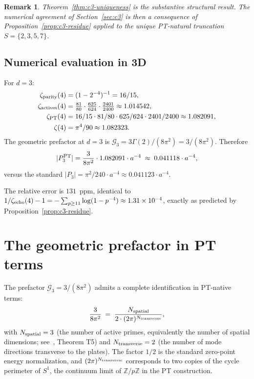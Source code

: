 \documentclass[11pt,a4paper]{article}
\newtheorem{remark}{Remark}
\newcommand{\PTset}{\{2,3,5,7\}}
\newcommand{\Nspatial}{N_{\rm spatial}}
\newcommand{\Ntrans}{N_{\rm transverse}}
\begin{document}
\begin{remark}
Theorem~\ref{thm:c3-uniqueness} is the substantive structural result. The numerical agreement
of Section~\ref{sec:c3} is then a consequence of Proposition~\ref{prop:c3-residue} applied to
the unique PT-natural truncation $S = \PTset$.
\end{remark}

\subsection{Numerical evaluation in 3D}

For $d = 3$:
\begin{align*}
\zeta_{\rm parity}(4) &= (1 - 2^{-4})^{-1} = 16/15,\\
\zeta_{\rm actives}(4) &= \tfrac{81}{80} \cdot \tfrac{625}{624} \cdot \tfrac{2401}{2400} \approx 1.014542,\\
\zeta_{\rm PT}(4) &= 16/15 \cdot 81/80 \cdot 625/624 \cdot 2401/2400 \approx 1.082091,\\
\zeta(4) &= \pi^{4}/90 \approx 1.082323.
\end{align*}
The geometric prefactor at $d = 3$ is
$\mathcal{G}_{3} = 3 \Gamma(2)/(8\pi^{2}) = 3/(8\pi^{2})$. Therefore
\[
|P_{3}^{\rm PT}| = \frac{3}{8\pi^{2}} \cdot 1.082091 \cdot a^{-4}
\;\approx\; 0.041118 \cdot a^{-4},
\]
versus the standard $|P_{3}| = \pi^{2}/240 \cdot a^{-4} \approx 0.041123 \cdot a^{-4}$.

The relative error is $131$~ppm, identical to $1/\zeta_{\rm echo}(4) - 1 = -\sum_{p \geq 11}\log(1-p^{-4}) \approx 1.31 \times 10^{-4}$, exactly as predicted by Proposition~\ref{prop:c3-residue}.

\section{The geometric prefactor in PT terms}
\label{sec:prefactor}

The prefactor $\mathcal{G}_{3} = 3/(8\pi^{2})$ admits a complete identification in PT-native terms:
\begin{equation}
\frac{3}{8\pi^{2}} \;=\; \frac{\Nspatial}{2 \cdot (2\pi)^{\Ntrans}},
\label{eq:prefactor-pt}
\end{equation}
with $\Nspatial = 3$ (the number of active primes, equivalently the number of spatial
dimensions; see~\cite{Senez2026}, Theorem T5) and $\Ntrans = 2$ (the number of mode directions
transverse to the plates). The factor $1/2$ is the standard zero-point energy normalization,
and $(2\pi)^{\Ntrans}$ corresponds to two copies of the cycle perimeter of $S^{1}$, the
continuum limit of $\mathbb{Z}/p\mathbb{Z}$ in the PT construction.
\end{document}
